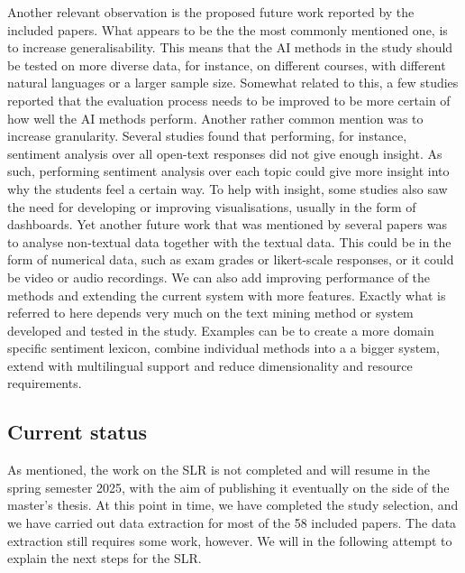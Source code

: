Another relevant observation is the proposed future work reported by the included papers. What appears to be the the most commonly mentioned one, is to increase generalisability. This means that the AI methods in the study should be tested on more diverse data, for instance, on different courses, with different natural languages or a larger sample size. Somewhat related to this, a few studies reported that the evaluation process needs to be improved to be more certain of how well the AI methods perform. Another rather common mention was to increase granularity. Several studies found that performing, for instance, sentiment analysis over all open-text responses did not give enough insight. As such, performing sentiment analysis over each topic could give more insight into why the students feel a certain way. To help with insight, some studies also saw the need for developing or improving visualisations, usually in the form of dashboards. Yet another future work that was mentioned by several papers was to analyse non-textual data together with the textual data. This could be in the form of numerical data, such as exam grades or likert-scale responses, or it could be video or audio recordings. We can also add improving performance of the methods and extending the current system with more features. Exactly what is referred to here depends very much on the text mining method or system developed and tested in the study. Examples can be to create a more domain specific sentiment lexicon, combine individual methods into a a bigger system, extend with multilingual support and reduce dimensionality and resource requirements.

\subsection{Current status}
As mentioned, the work on the SLR is not completed and will resume in the spring semester 2025, with the aim of publishing it eventually on the side of the master's thesis. At this point in time, we have completed the study selection, and we have carried out data extraction for most of the 58 included papers. The data extraction still requires some work, however. We will in the following attempt to explain the next steps for the SLR.


